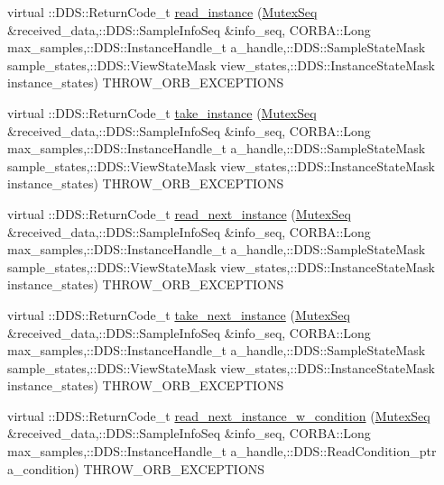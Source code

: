 \begin{DoxyCompactItemize}
\item 
virtual ::DDS::ReturnCode\_\-t \hyperlink{classKnowledge_1_1MutexDataReaderView__impl_a4b23ab0bf64488f99f2ce1b81b7d5589}{read\_\-instance} (\hyperlink{namespaceKnowledge_a3165529aa87299c6a92754fbd7eeeff4}{MutexSeq} \&received\_\-data,::DDS::SampleInfoSeq \&info\_\-seq, CORBA::Long max\_\-samples,::DDS::InstanceHandle\_\-t a\_\-handle,::DDS::SampleStateMask sample\_\-states,::DDS::ViewStateMask view\_\-states,::DDS::InstanceStateMask instance\_\-states) THROW\_\-ORB\_\-EXCEPTIONS
\item 
virtual ::DDS::ReturnCode\_\-t \hyperlink{classKnowledge_1_1MutexDataReaderView__impl_a21e84ee03c4e5224b604d6f36d07fd7d}{take\_\-instance} (\hyperlink{namespaceKnowledge_a3165529aa87299c6a92754fbd7eeeff4}{MutexSeq} \&received\_\-data,::DDS::SampleInfoSeq \&info\_\-seq, CORBA::Long max\_\-samples,::DDS::InstanceHandle\_\-t a\_\-handle,::DDS::SampleStateMask sample\_\-states,::DDS::ViewStateMask view\_\-states,::DDS::InstanceStateMask instance\_\-states) THROW\_\-ORB\_\-EXCEPTIONS
\item 
virtual ::DDS::ReturnCode\_\-t \hyperlink{classKnowledge_1_1MutexDataReaderView__impl_a507c72d8f9523a4db7411a8cdefdb1e6}{read\_\-next\_\-instance} (\hyperlink{namespaceKnowledge_a3165529aa87299c6a92754fbd7eeeff4}{MutexSeq} \&received\_\-data,::DDS::SampleInfoSeq \&info\_\-seq, CORBA::Long max\_\-samples,::DDS::InstanceHandle\_\-t a\_\-handle,::DDS::SampleStateMask sample\_\-states,::DDS::ViewStateMask view\_\-states,::DDS::InstanceStateMask instance\_\-states) THROW\_\-ORB\_\-EXCEPTIONS
\item 
virtual ::DDS::ReturnCode\_\-t \hyperlink{classKnowledge_1_1MutexDataReaderView__impl_a74e82408b5f6f4b6a7ff8d17b625bb88}{take\_\-next\_\-instance} (\hyperlink{namespaceKnowledge_a3165529aa87299c6a92754fbd7eeeff4}{MutexSeq} \&received\_\-data,::DDS::SampleInfoSeq \&info\_\-seq, CORBA::Long max\_\-samples,::DDS::InstanceHandle\_\-t a\_\-handle,::DDS::SampleStateMask sample\_\-states,::DDS::ViewStateMask view\_\-states,::DDS::InstanceStateMask instance\_\-states) THROW\_\-ORB\_\-EXCEPTIONS
\item 
virtual ::DDS::ReturnCode\_\-t \hyperlink{classKnowledge_1_1MutexDataReaderView__impl_a4d830005b467e12fee8eb146d98e4f23}{read\_\-next\_\-instance\_\-w\_\-condition} (\hyperlink{namespaceKnowledge_a3165529aa87299c6a92754fbd7eeeff4}{MutexSeq} \&received\_\-data,::DDS::SampleInfoSeq \&info\_\-seq, CORBA::Long max\_\-samples,::DDS::InstanceHandle\_\-t a\_\-handle,::DDS::ReadCondition\_\-ptr a\_\-condition) THROW\_\-ORB\_\-EXCEPTIONS

\end{DoxyCompactItemize}
